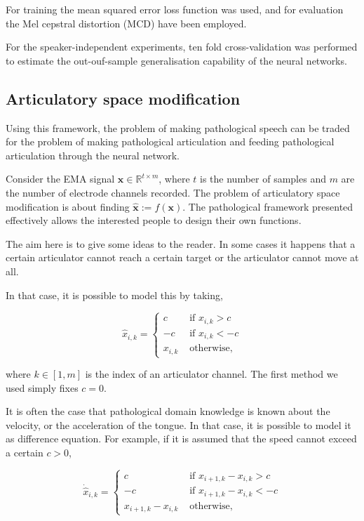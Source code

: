 \documentclass[a4paper]{article}
\begin{document}
For training the mean squared error loss function was used, and for
evaluation the Mel cepstral distortion (MCD) have been employed. \cite{Kubichek1993}

For the speaker-independent experiments, ten fold cross-validation was performed
to estimate the out-ouf-sample generalisation capability of the neural networks.

\subsection{Articulatory space modification} \label{section:speech}

Using this framework, the problem of making pathological speech
can be traded for the problem of making pathological articulation and
feeding pathological articulation through the neural network.

Consider the EMA signal \( \mathbf{x} \in \mathbb{R}^{t \times m} \), where \( t \) is
the number of samples and \( m \)  are the number of electrode channels
recorded. The problem of articulatory space modification is about finding
\( \mathbf{\hat{x}} := f(\mathbf{x}) \). The pathological
framework presented effectively allows the interested people to design
their own functions.

The aim here is to give some ideas to the reader.
In some cases it happens that a certain articulator cannot reach a certain
target or the articulator cannot move at all.

In that case, it is possible to model this by taking, 

\begin{equation*}
  \hat{x}_{i,k} =
  \begin{cases}
    c & \text{ if $x_{i,k} > c$} \\
    -c & \text{ if $x_{i,k} < -c$} \\
    x_{i,k}& \text{ otherwise},
    \end{cases}
  \end{equation*}

  where \( k \in [1,m] \) is the index of an articulator channel.
  The first method we used simply fixes $ c = 0 $.

It is often the case that pathological domain knowledge is known about
the velocity, or the acceleration of the tongue. In that case, it is
possible to model it as difference equation. For example, if it is assumed
that the speed cannot exceed a certain \( c > 0 \),

\begin{equation*}
  \dot{\hat{x}}_{i,k} =
  \begin{cases}
    c & \text{ if $x_{i+1,k} - x_{i,k}> c$} \\
    -c & \text{ if $x_{i+1,k} - x_{i,k} < -c$} \\
    x_{i+1,k} - x_{i,k} & \text{ otherwise},
    \end{cases}
  \end{equation*}
\end{document}
